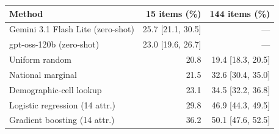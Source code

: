 \begin{tabular}{@{}lrr@{}}
\toprule
\textbf{Method} & \textbf{15 items (\%)} & \textbf{144 items (\%)} \\
\midrule
Gemini 3.1 Flash Lite (zero-shot) & 25.7 [21.1, 30.5] & --- \\
gpt-oss-120b (zero-shot) & 23.0 [19.6, 26.7] & --- \\
\midrule
Uniform random & 20.8 & 19.4 [18.3, 20.5] \\
National marginal & 21.5 & 32.6 [30.4, 35.0] \\
Demographic-cell lookup & 23.1 & 34.5 [32.2, 36.8] \\
Logistic regression (14 attr.) & 29.8 & 46.9 [44.3, 49.5] \\
Gradient boosting (14 attr.) & 36.2 & 50.1 [47.6, 52.5] \\
\bottomrule
\end{tabular}